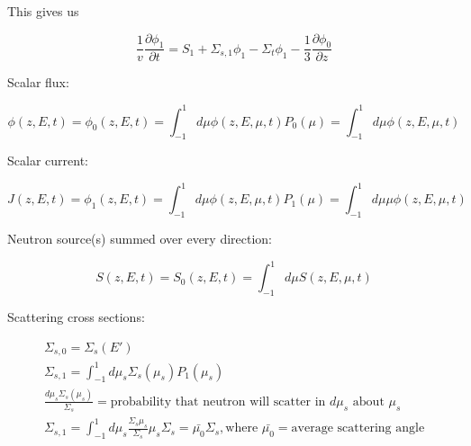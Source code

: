 \documentclass[12pt]{article}
\newcommand{\sigso}{\ensuremath{\Sigma_{s,0}}}
\newcommand{\sigsi}{\ensuremath{\Sigma_{s,1}}}
\begin{document}
This gives us

\begin{equation*}
\frac{1}{v}\frac{\partial\phi_1}{\partial t} = S_1 + \sigsi\phi_1 - \Sigma_t\phi_1 - 
\frac{1}{3}\frac{\partial\phi_0}{\partial z}
\end{equation*}

Scalar flux:

\begin{equation*}
\phi(z,E,t) = \phi_0(z,E,t) = \int_{-1}^{1}d\mu\phi(z,E,\mu,t)P_0(\mu) = \int_{-1}^{1}d\mu\phi(z,E,\mu,t)
\end{equation*}

Scalar current:

\begin{equation*}
J(z,E,t) = \phi_1(z,E,t) = \int_{-1}^{1}d\mu\phi(z,E,\mu,t)P_1(\mu) = \int_{-1}^{1}d\mu\mu\phi(z,E,\mu,t)
\end{equation*}

Neutron source(s) summed over every direction:

\begin{equation*}
S(z,E,t) = S_0(z,E,t) = \int_{-1}^{1}d\mu S(z,E,\mu,t)
\end{equation*}

Scattering cross sections:

\begin{gather*}
\sigso = \Sigma_s(E') \\
\sigsi = \int_{-1}^1d\mu_s\Sigma_s(\mu_s)P_1(\mu_s) \\
\frac{d\mu_s\Sigma_s(\mu_s)}{\Sigma_s} = \text{probability that neutron will scatter in $d\mu_s$ about $\mu_s$} \\
\sigsi = \int_{-1}^1d\mu_s\frac{\Sigma_s\mu_s}{\Sigma_s}\mu_s\Sigma_s = \bar{\mu_0}\Sigma_s, 
\text{where $\bar{\mu_0} = $average scattering angle}
\end{gather*}
\end{document}
